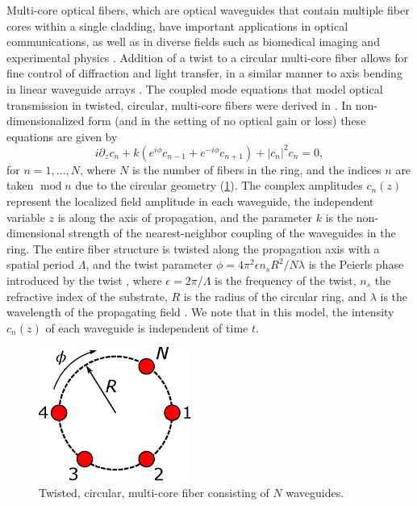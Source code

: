 \documentclass[11pt,reqno]{amsart}
\DeclareMathOperator{\md}{mod}
\begin{document}
Multi-core optical fibers, which are optical waveguides that contain multiple fiber cores within a single cladding, have important applications in optical communications, as well as in diverse fields such as biomedical imaging and experimental physics \cite{Ortiz2018}. Addition of a twist to a circular multi-core fiber allows for fine control of diffraction and light transfer, in a similar manner to axis bending in linear waveguide arrays \cite{Longhi2005}. The coupled mode equations that model optical transmission in twisted, circular, multi-core fibers were derived in \cite{Longhi2007,Longhi2007b,Garanovich2012}. In non-dimensionalized form (and in the setting of no optical gain or loss) these equations are given by
\begin{equation}\label{eq:coupledmode}
i \partial_z c_n + k \left(e^{i\phi}c_{n-1} + e^{-i\phi}c_{n+1} \right) + |c_n|^2 c_n = 0,
\end{equation}
for $n = 1, \dots, N$, where $N$ is the number of fibers in the ring, and the indices $n$ are taken $\md n$ due to the circular geometry (\cref{fig:circle}).
The complex amplitudes $c_n(z)$ represent the localized field amplitude in each waveguide, the independent variable $z$ is along the axis of propagation, and the parameter $k$ is the non-dimensional strength of the nearest-neighbor coupling of the waveguides in the ring. The entire fiber structure is twisted along the propagation axis with a spatial period $\Lambda$, and the twist parameter $\phi = 4 \pi^2 \epsilon n_s R^2/N \lambda$ is the Peierls phase introduced by the twist \cite{Longhi2007,Peierls1933}, where $\epsilon = 2 \pi / \Lambda$ is the frequency of the twist, $n_s$ the refractive index of the substrate, $R$ is the radius of the circular ring, and $\lambda$ is the wavelength of the propagating field \cite{castro2016,Parto2017}. We note that in this model, the intensity $c_n(z)$ of each waveguide is independent of time $t$.

\begin{figure}
\begin{center}
\includegraphics[width=5cm]{circle}
\end{center}
\caption{Twisted, circular, multi-core fiber consisting of $N$ waveguides.}
\label{fig:circle}
\end{figure}
\end{document}
